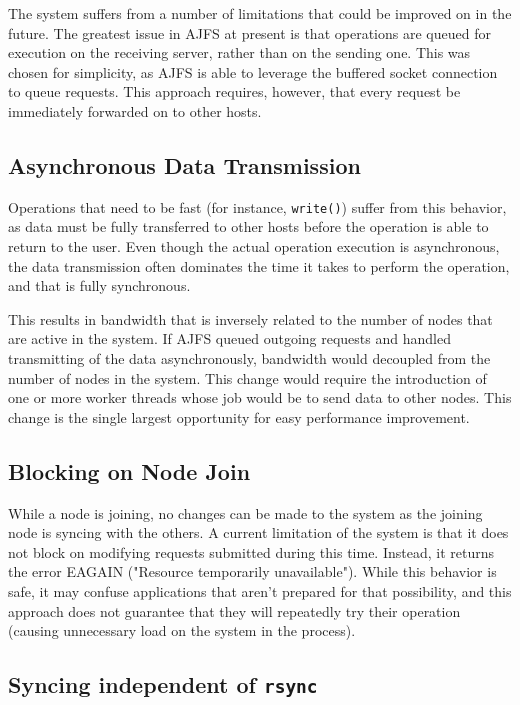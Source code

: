 
The system suffers from a number of limitations that could be improved on in the
future. The greatest issue in AJFS at present is that operations are queued for
execution on the receiving server, rather than on the sending one. This was
chosen for simplicity, as AJFS is able to leverage the buffered socket
connection to queue requests. This approach requires, however, that every
request be immediately forwarded on to other hosts.

\subsection{Asynchronous Data Transmission}

Operations that need to be fast (for instance, \texttt{write()}) suffer from
this behavior, as data must  be fully transferred to other hosts before the
operation is able to return to the user. Even though the actual operation
execution is asynchronous, the data transmission often dominates the time it
takes to perform the operation, and that is fully synchronous.

This results in bandwidth that is inversely related to the number of nodes
that are active in the system. If AJFS queued outgoing requests and handled
transmitting of the data asynchronously, bandwidth would decoupled from the 
number of nodes in the system. This change would require the introduction of one
or more worker threads whose job would be to send data to other nodes. This
change is the single largest opportunity for easy performance improvement.

\subsection{Blocking on Node Join}

While a node is joining, no changes can be made to the system as the joining
node is syncing with the others. A current limitation of the system is that it
does not block on modifying requests submitted during this time. Instead, it
returns the error EAGAIN ("Resource temporarily unavailable"). While this
behavior is safe, it may confuse applications that aren't prepared for that
possibility, and this approach does not guarantee that they will repeatedly try
their operation (causing unnecessary load on the system in the process).

\subsection{Syncing independent of \texttt{rsync}}

